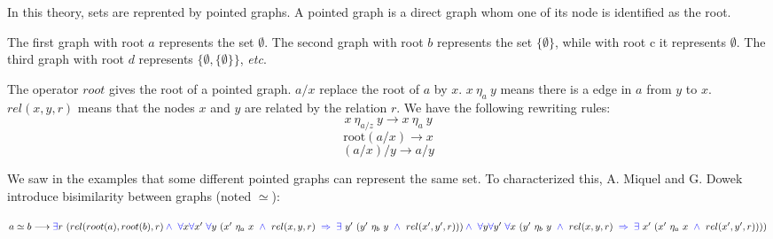 \documentclass[a4paper]{article}
\begin{document}
In this theory, sets are reprented by pointed graphs. A pointed graph is a direct graph whom one of its node is identified as the root. 

\begin{figure}[h]
\end{figure}

The first graph with root $a$ represents the set $\emptyset$. The second graph with root $b$ represents the set $\{\emptyset\}$, while with root c it represents $\emptyset$. The third graph with root $d$ represents $\{\emptyset,\{\emptyset\}\}$, \textit{etc}.

The operator $root$ gives the root of a pointed graph. $a/x$ replace the root of $a$ by $x$. $x~\eta_a~y$ means there is a edge in $a$ from $y$ to $x$. $rel(x,y,r)$ means that the nodes $x$ and $y$ are related by the relation $r$. We have the following rewriting rules:
$$ x \ \eta_{a/z} \ y \longrightarrow x \ \eta_a \ y $$
$$ \text{root}(a/x) \longrightarrow x $$
$$ (a/x)/y \longrightarrow a/y $$

We saw in the examples that some different pointed graphs can represent the same set. To characterized this, A. Miquel and G. Dowek introduce bisimilarity between graphs (noted $\simeq$): 

$a \simeq b \longrightarrow {\color{blue} \exists} r~(rel(root(a),root(b),r) \\
\mathbin{\color{blue} \wedge} \ {\color{blue} \forall} x {\color{blue} \forall} x'~{\color{blue} \forall} y~(x'~\eta_a~x~\mathbin{\color{blue} \wedge}~rel(x, y, r)~\mathbin{\color{blue} \Rightarrow}~{\color{blue} \exists}~y'~(y'~\eta_b~y~\mathbin{\color{blue} \wedge}~rel(x', y', r))) \\
\mathbin{\color{blue} \wedge} \ {\color{blue} \forall} y {\color{blue} \forall} y'~{\color{blue} \forall} x~(y'~\eta_b~y~\mathbin{\color{blue} \wedge}~rel(x, y, r)~\mathbin{\color{blue} \Rightarrow}~{\color{blue} \exists}~x'~(x'~\eta_a~x~\mathbin{\color{blue} \wedge}~rel(x', y', r))))$
\end{document}
